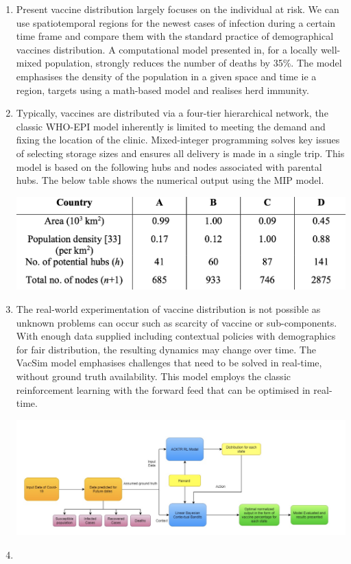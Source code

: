 \documentclass{article}
\begin{document}
\begin{enumerate}
	\item Present vaccine distribution largely focuses on the individual at risk. We can use spatiotemporal regions for the newest cases of infection during a certain time frame and compare them with the standard practice of demographical vaccines distribution. A computational model presented in\cite{grauer2020strategic}, for a locally well-mixed population, strongly reduces the number of deaths by 35\%. The model emphasises the density of the population in a given space and time ie a region, targets using a math-based model and realises herd immunity.
	\item Typically, vaccines are distributed via a four-tier hierarchical network, the classic WHO-EPI model inherently is limited to meeting the demand and fixing the location of the clinic. Mixed-integer programming solves key issues of selecting storage sizes and ensures all delivery is made in a single trip\cite{yang2020optimizing}. This model is based on the following hubs and nodes associated with parental hubs. The below table shows the numerical output using the MIP model.
  
	\includegraphics[scale=0.4]{maths.png}
	\item The real-world experimentation of vaccine distribution is not possible as unknown problems can occur such as scarcity of vaccine or sub-components. With enough data supplied including contextual policies with demographics for fair distribution, the resulting dynamics may change over time. The VacSim model emphasises challenges that need to be solved in real-time, without ground truth availability. This model employs the classic reinforcement learning with the forward feed that can be optimised in real-time.\cite{awasthi2020vacsim}

\includegraphics[width=\textwidth]{model.png}
	\item 

\end{enumerate} 
\end{document}
